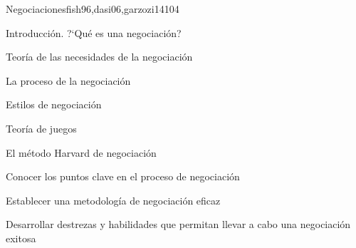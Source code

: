 \begin{syllabus}
\begin{unit}{Negociaciones}{}{fish96,dasi06,garzozi14}{10}{4}
\begin{topics}
      \item Introducción. ?`Qué es una negociación?
      \item Teoría de las necesidades de la negociación
      \item La proceso de la negociación
      \item Estilos de negociación
      \item Teoría de juegos
      \item El método Harvard de negociación
   \end{topics}
   \begin{learningoutcomes}
      \item Conocer los puntos clave en el proceso de negociación
      \item Establecer una metodología de negociación eficaz
      \item Desarrollar destrezas y habilidades que permitan llevar a cabo una negociación exitosa
   \end{learningoutcomes}
\end{unit}




\begin{coursebibliography}
\end{coursebibliography}

\end{syllabus}

%
